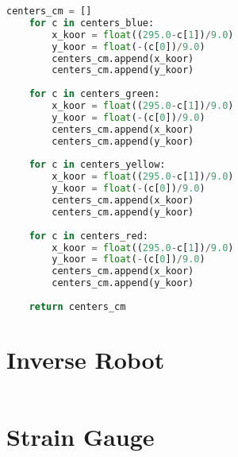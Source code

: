 \begin{lstlisting}[language=Python]
    centers_cm = []
    for c in centers_blue:
        x_koor = float((295.0-c[1])/9.0)
        y_koor = float(-(c[0])/9.0)
        centers_cm.append(x_koor)
        centers_cm.append(y_koor)
        
    for c in centers_green:
        x_koor = float((295.0-c[1])/9.0)
        y_koor = float(-(c[0])/9.0)
        centers_cm.append(x_koor)
        centers_cm.append(y_koor)
        
    for c in centers_yellow:
        x_koor = float((295.0-c[1])/9.0)
        y_koor = float(-(c[0])/9.0)
        centers_cm.append(x_koor)
        centers_cm.append(y_koor)
    
    for c in centers_red:
        x_koor = float((295.0-c[1])/9.0)
        y_koor = float(-(c[0])/9.0)
        centers_cm.append(x_koor)
        centers_cm.append(y_koor)
                          
    return centers_cm
\end{lstlisting}
\section{Inverse Robot}\label{sec:InvRobot}
\begin{lstlisting}[language=Python]
\end{lstlisting}
\section{Strain Gauge}\label{sec:StrainGauge}
\begin{lstlisting}[language=C]
\end{lstlisting}
